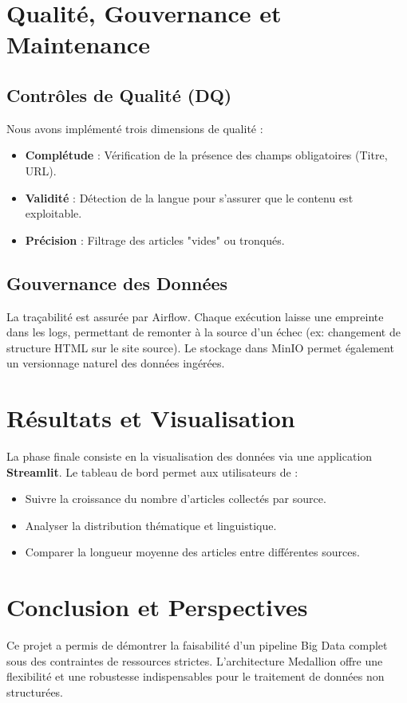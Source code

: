 \documentclass[12pt,a4paper]{article}
\begin{document}
\section{Qualité, Gouvernance et Maintenance}
\subsection{Contrôles de Qualité (DQ)}
Nous avons implémenté trois dimensions de qualité :
\begin{itemize}
    \item \textbf{Complétude} : Vérification de la présence des champs obligatoires (Titre, URL).
    \item \textbf{Validité} : Détection de la langue pour s'assurer que le contenu est exploitable.
    \item \textbf{Précision} : Filtrage des articles "vides" ou tronqués.
\end{itemize}

\subsection{Gouvernance des Données}
La traçabilité est assurée par Airflow. Chaque exécution laisse une empreinte dans les logs, permettant de remonter à la source d'un échec (ex: changement de structure HTML sur le site source). Le stockage dans MinIO permet également un versionnage naturel des données ingérées.

\section{Résultats et Visualisation}
La phase finale consiste en la visualisation des données via une application \textbf{Streamlit}.
Le tableau de bord permet aux utilisateurs de :
\begin{itemize}
    \item Suivre la croissance du nombre d'articles collectés par source.
    \item Analyser la distribution thématique et linguistique.
    \item Comparer la longueur moyenne des articles entre différentes sources.
\end{itemize}

\section{Conclusion et Perspectives}
Ce projet a permis de démontrer la faisabilité d'un pipeline Big Data complet sous des contraintes de ressources strictes. L'architecture Medallion offre une flexibilité et une robustesse indispensables pour le traitement de données non structurées.
\end{document}
